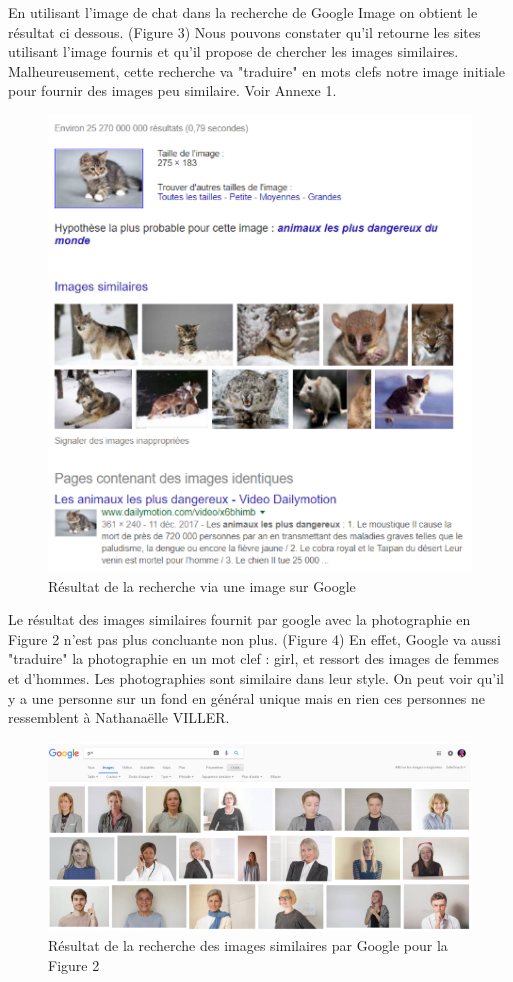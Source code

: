 \documentclass[a4paper,12pt]{article}
\begin{document}
En utilisant l'image de chat dans la recherche de Google Image on obtient le résultat ci dessous. (Figure 3) Nous pouvons constater qu'il retourne les sites utilisant l'image fournis et qu'il propose de chercher les images similaires.  Malheureusement, cette recherche va "traduire" en mots clefs notre image initiale pour fournir des images peu similaire. Voir Annexe 1. 

    \begin{figure}[!h]
    \centering
        \includegraphics[scale=1]{images/ResGI.PNG}
        \caption{Résultat de la recherche via une image sur Google}
    \end{figure}

Le résultat des images similaires fournit par google avec la photographie en Figure 2 n'est pas plus concluante non plus. (Figure 4) En effet, Google va aussi "traduire" la photographie en un mot clef : girl, et ressort des images de femmes et d'hommes. Les photographies sont similaire dans leur style. On peut voir qu'il y a une personne sur un fond en général unique mais en rien ces personnes ne ressemblent à Nathanaëlle VILLER. 
    \begin{figure}[!h]
    \centering
        \includegraphics[scale=0.7]{images/Res3GI.PNG}
        \caption{Résultat de la recherche des images similaires par Google pour la Figure 2}
    \end{figure}
    
\end{document}
